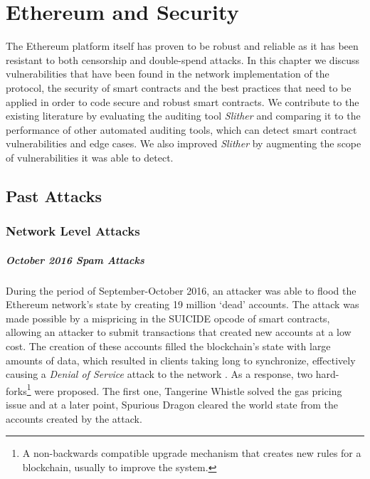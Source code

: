 \chapter{Ethereum and Security} \label{ch:security}

The Ethereum platform itself has proven to be robust and reliable as it has been resistant to both censorship and double-spend attacks. In this chapter we discuss vulnerabilities that have been found in the network implementation of the protocol, the security of smart contracts and the best practices that need to be applied in order to code secure and robust smart contracts. We contribute to the existing literature by evaluating the auditing tool \textit{Slither} and comparing it to the performance of other automated auditing tools, which can detect smart contract vulnerabilities and edge cases. We also improved \textit{Slither} by augmenting the scope of vulnerabilities it was able to detect.

\section{Past Attacks} \label{past-attacks}

\subsection{Network Level Attacks}

\paragraph{October 2016 Spam Attacks}
During the period of September-October 2016, an attacker was able to flood the Ethereum network's state by creating 19 million `dead' accounts. The attack was made possible by a mispricing in the SUICIDE opcode of smart contracts, allowing an attacker to submit transactions that created new accounts at a low cost. The creation of these accounts filled the blockchain's state with large amounts of data, which resulted in clients taking long to synchronize, effectively causing a \textit{Denial of Service} attack to the network \cite{eip150faq}. As a response, two hard-forks\footnote{A non-backwards compatible upgrade mechanism that creates new rules for a blockchain, usually to improve the system.} were proposed. The first one, Tangerine Whistle\cite{eip608} solved the gas pricing issue and at a later point, Spurious Dragon\cite{eip608} cleared the world state from the accounts created by the attack. 


